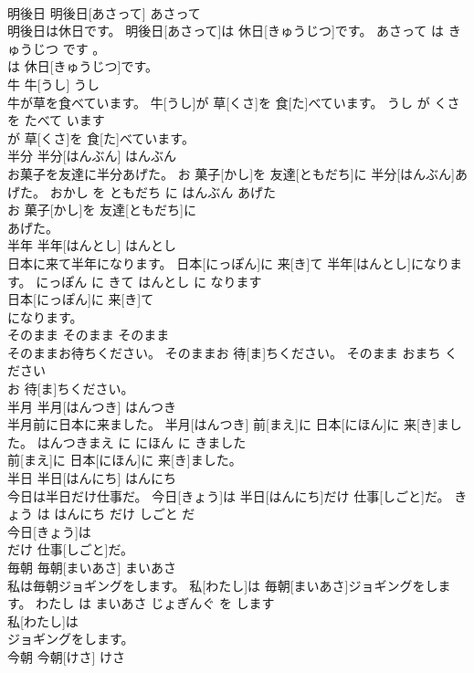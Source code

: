 \documentclass[8pt]{extreport}
\begin{document}
\begin{CJK}{UTF8}{min}
\\	明後日	明後日[あさって]	あさって	
\\	明後日は休日です。	明後日[あさって]は 休日[きゅうじつ]です。	あさって は きゅうじつ です 。	
\\	は 休日[きゅうじつ]です。			
\\	牛	牛[うし]	うし	
\\	牛が草を食べています。	牛[うし]が 草[くさ]を 食[た]べています。	うし が くさ を たべて います	
\\	が 草[くさ]を 食[た]べています。			
\\	半分	半分[はんぶん]	はんぶん	
\\	お菓子を友達に半分あげた。	お 菓子[かし]を 友達[ともだち]に 半分[はんぶん]あげた。	おかし を ともだち に はんぶん あげた	
\\	お 菓子[かし]を 友達[ともだち]に
\\	あげた。			
\\	半年	半年[はんとし]	はんとし	
\\	日本に来て半年になります。	日本[にっぽん]に 来[き]て 半年[はんとし]になります。	にっぽん に きて はんとし に なります	
\\	日本[にっぽん]に 来[き]て
\\	になります。			
\\	そのまま	そのまま	そのまま	
\\	そのままお待ちください。	そのままお 待[ま]ちください。	そのまま おまち ください	
\\	お 待[ま]ちください。			
\\	半月	半月[はんつき]	はんつき	
\\	半月前に日本に来ました。	半月[はんつき] 前[まえ]に 日本[にほん]に 来[き]ました。	はんつきまえ に にほん に きました	
\\	前[まえ]に 日本[にほん]に 来[き]ました。			
\\	半日	半日[はんにち]	はんにち	
\\	今日は半日だけ仕事だ。	今日[きょう]は 半日[はんにち]だけ 仕事[しごと]だ。	きょう は はんにち だけ しごと だ	
\\	今日[きょう]は
\\	だけ 仕事[しごと]だ。			
\\	毎朝	毎朝[まいあさ]	まいあさ	
\\	私は毎朝ジョギングをします。	私[わたし]は 毎朝[まいあさ]ジョギングをします。	わたし は まいあさ じょぎんぐ を します	
\\	私[わたし]は
\\	ジョギングをします。			
\\	今朝	今朝[けさ]	けさ	

\end{CJK}
\end{document}
